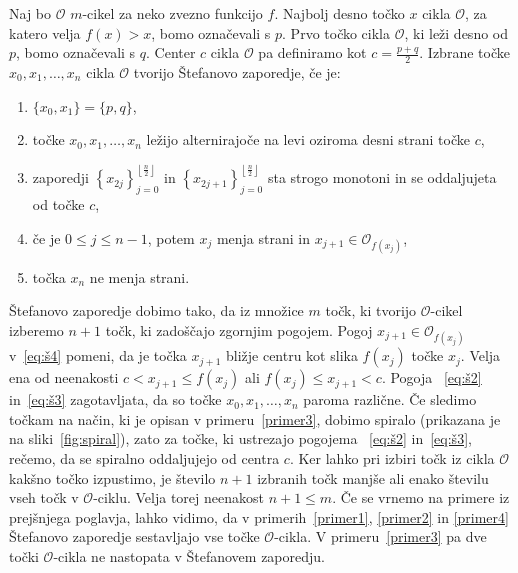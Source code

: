 \documentclass[../TG_magistrsko_delo_sections.tex]{subfiles}
\begin{document}
\begin{definicija}\label{def:stef}
Naj bo $\mathcal{O}$ $m$-cikel za neko zvezno funkcijo $f$. Najbolj desno točko $x$ cikla $\mathcal{O}$, za katero velja $f(x) > x$, bomo označevali s $p$. Prvo točko cikla $\mathcal{O}$, ki leži desno od $p$, bomo označevali s $q$. Center $c$ cikla $\mathcal{O}$ pa definiramo kot $c = \frac{p+q}{2}$. Izbrane točke $x_0, x_1, \dots, x_n$ cikla $\mathcal{O}$ tvorijo Štefanovo zaporedje, če je:

\begin{enumerate}[label={(Š\arabic*)}]\label{def:stef-zap}
    \item $\{x_0, x_1\} = \{p, q\}$, \label{eq:š1}
    \item točke $x_0, x_1, \dots, x_n$ ležijo alternirajoče na levi oziroma desni strani točke $c$, \label{eq:š2}
    \item zaporedji 
    $\left \{ x_{2j} \right \}_{j=0}^{\left \lfloor \frac{n}{2} \right \rfloor}$ 
    in
    $\left \{ x_{2j+1} \right \}_{j=0}^{\left \lfloor \frac{n}{2} \right \rfloor}$ sta strogo monotoni in se oddaljujeta od točke $c$, \label{eq:š3}
    \item če je $0\leq j \leq n-1$, potem $x_j$ menja strani in $x_{j+1} \in \mathcal{O}_{f(x_j)}$,\label{eq:š4}
    \item točka $x_n$ ne menja strani. \label{eq:š5}
\end{enumerate}
\end{definicija}

\begin{opomba}\label{op:štefzap}
Štefanovo zaporedje dobimo tako, da iz množice $m$ točk, ki tvorijo $\mathcal{O}$-cikel izberemo $n+1$ točk, ki zadoščajo zgornjim pogojem. 
Pogoj $x_{j+1} \in \mathcal{O}_{f(x_j)}$ v~\ref{eq:š4} pomeni, da je točka $x_{j+1}$ bližje centru kot slika $f(x_j)$ točke $x_j$. Velja ena od neenakosti $c < x_{j+1} \leq f(x_j)$ ali $f(x_j) \leq x_{j+1} < c$. Pogoja ~\ref{eq:š2} in~\ref{eq:š3} zagotavljata, da so točke $x_0, x_1, \dots, x_n$ paroma različne. Če sledimo točkam na način, ki je opisan v primeru~\ref{primer3}, dobimo spiralo (prikazana je na sliki~\ref{fig:spiral}), zato za točke, ki ustrezajo pogojema ~\ref{eq:š2} in~\ref{eq:š3}, rečemo, da se spiralno oddaljujejo od centra $c$. Ker lahko pri izbiri točk iz cikla $\mathcal{O}$ kakšno točko izpustimo, je število $n+1$ izbranih točk manjše ali enako številu vseh točk v $\mathcal{O}$-ciklu. Velja torej neenakost $n+1 \leq m$. Če se vrnemo na primere iz prejšnjega poglavja, lahko vidimo, da v primerih~\ref{primer1}, \ref{primer2} in \ref{primer4} Štefanovo zaporedje sestavljajo vse točke $\mathcal{O}$-cikla. V primeru~\ref{primer3} pa dve točki $\mathcal{O}$-cikla ne nastopata v Štefanovem zaporedju.
\end{opomba}
\end{document}
